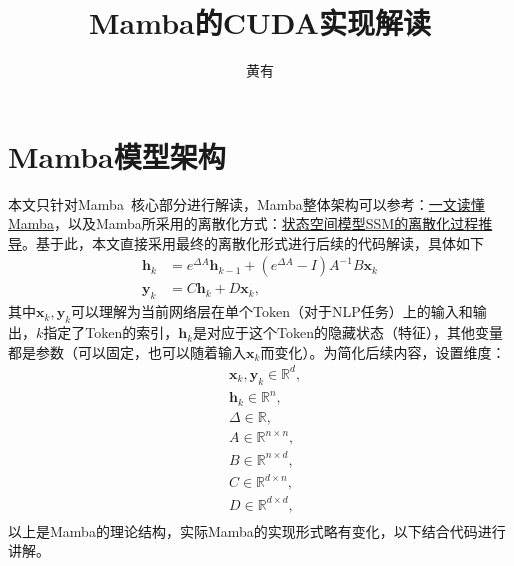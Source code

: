 \documentclass{ctexart}
\title{Mamba的CUDA实现解读}
\author{黄有}
\date{}
\begin{document}
\maketitle

\section{Mamba模型架构}
本文只针对Mamba~\cite{gu2023mamba}核心部分进行解读，Mamba整体架构可以参考：\href{https://zhuanlan.zhihu.com/p/680846351}{一文读懂Mamba}，以及Mamba所采用的离散化方式：\href{https://zhuanlan.zhihu.com/p/680534665}{状态空间模型SSM的离散化过程推导}。基于此，本文直接采用最终的离散化形式进行后续的代码解读，具体如下
\begin{equation*}
\begin{split}
    \bm{h}_k &= e^{\Delta A}\bm{h}_{k-1} + \left(e^{\Delta A} - I\right)A^{-1}B\bm{x}_k \\
    \bm{y}_k &= C\bm{h}_k + D\bm{x}_k,
\end{split}
\end{equation*}
其中$\bm{x}_k, \bm{y}_k$可以理解为当前网络层在单个Token（对于NLP任务）上的输入和输出，$k$指定了Token的索引，$\bm{h}_k$是对应于这个Token的隐藏状态（特征），其他变量都是参数（可以固定，也可以随着输入$\bm{x}_k$而变化）。为简化后续内容，设置维度：
\begin{equation*}
\begin{split}
    &\bm{x}_k, \bm{y}_k \in \mathbb{R}^{d}, \\
    &\bm{h}_k \in \mathbb{R}^{n}, \\
    &\Delta \in \mathbb{R}, \\
    &A \in \mathbb{R}^{n\times n}, \\
    &B \in \mathbb{R}^{n\times d}, \\
    &C \in \mathbb{R}^{d\times n}, \\
    &D \in \mathbb{R}^{d\times d}, \\
\end{split}
\end{equation*}
以上是Mamba的理论结构，实际Mamba的实现形式略有变化，以下结合代码进行讲解。
\end{document}
